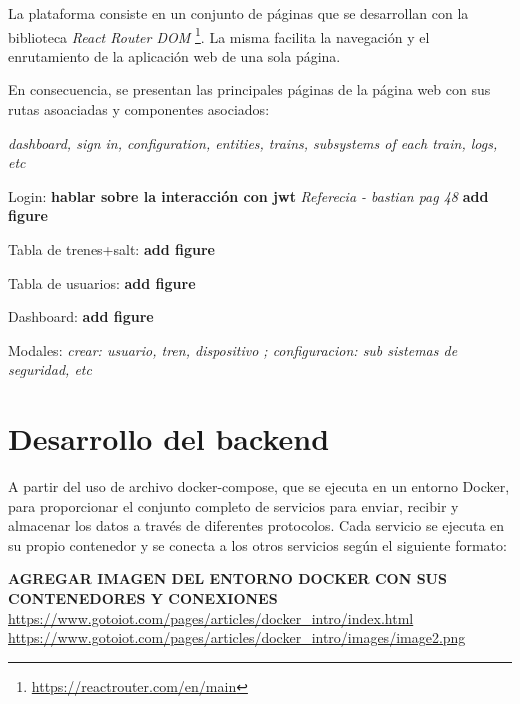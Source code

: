 La plataforma consiste en un conjunto de páginas que se desarrollan con la biblioteca \textit{React Router DOM} \footnote{\url{https://reactrouter.com/en/main}}. La misma facilita la navegación y el enrutamiento de la aplicación web de una sola página.

En consecuencia, se presentan las principales páginas de la página web con sus rutas asoaciadas y componentes asociados:



\textit{dashboard, sign in, configuration, entities, trains, subsystems of each train, logs, etc}

Login: \textbf{hablar sobre la interacción con jwt} \textit{Referecia - bastian pag 48} \textbf{add figure}

Tabla de trenes+salt: \textbf{add figure}

Tabla de usuarios: \textbf{add figure}

Dashboard: \textbf{add figure}

Modales: \textit{crear: usuario, tren, dispositivo ; configuracion: sub sistemas de seguridad, etc}




\newpage
\section{Desarrollo del backend}


A partir del uso de archivo docker-compose, que se ejecuta en un entorno Docker, para proporcionar el conjunto completo de servicios para enviar, recibir y almacenar los datos a través de diferentes protocolos. Cada servicio se ejecuta en su propio contenedor y se conecta a los otros servicios según el siguiente formato:


\textbf{AGREGAR IMAGEN DEL ENTORNO DOCKER CON SUS CONTENEDORES Y CONEXIONES }
\url{https://www.gotoiot.com/pages/articles/docker_intro/index.html}
\url{https://www.gotoiot.com/pages/articles/docker_intro/images/image2.png}


